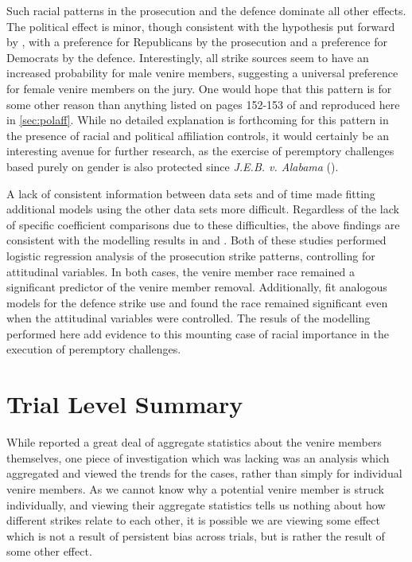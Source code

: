 Such racial patterns in the prosecution and the defence dominate all other effects. The political effect is minor, though
consistent with the hypothesis put forward by \cite{revesz2016}, with a preference for Republicans by the prosecution and a
preference for Democrats by the defence. Interestingly, all strike sources seem to have an increased probability for male venire
members, suggesting a universal preference for female venire members on the jury. One would hope that this pattern is for some
other reason than anything listed on pages 152-153 of \cite{vandykejurysel} and reproduced here in \ref{sec:polaff}. While no
detailed explanation is forthcoming for this pattern in the presence of racial and political affiliation controls, it would
certainly be an interesting avenue for further research, as the exercise of peremptory challenges based purely on gender is also
protected since \textit{J.E.B. v. Alabama} (\cite{jebvalabama}).

A lack of consistent information between data sets and of time made fitting additional models using the other data sets more
difficult. Regardless of the lack of specific coefficient comparisons due to these difficulties, the above findings are consistent
with the modelling results in \cite{StubbornLegacy} and \cite{PerempChalMurder}. Both of these studies performed logistic
regression analysis of the prosecution strike patterns, controlling for attitudinal variables. In both cases, the venire member
race remained a significant predictor of the venire member removal. Additionally, \citeauthor{PerempChalMurder} fit analogous
models for the defence strike use and found the race remained significant even when the attitudinal variables were
controlled. The resuls of the modelling performed here add evidence to this mounting case of racial importance in the execution of
peremptory challenges.
                
\section{Trial Level Summary} \label{sec:casesum}

While \cite{JurySunshineProj} reported a great deal of aggregate statistics about the venire members themselves, one piece of
investigation which was lacking was an analysis which aggregated and viewed the trends for the cases, rather than simply for
individual venire members. As we cannot know why a potential venire member is struck individually, and viewing their aggregate
statistics tells us nothing about how different strikes relate to each other, it is possible we are viewing some effect which is
not a result of persistent bias across trials, but is rather the result of some other effect.

